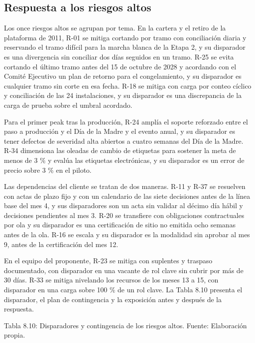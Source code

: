 \documentclass[11pt]{article}
\begin{document}
\subsection{Respuesta a los riesgos altos}

Los once riesgos altos se agrupan por tema. En la cartera y el retiro de la plataforma de 2011, R-01 se mitiga cortando por tramo con conciliación diaria y reservando el tramo difícil para la marcha blanca de la Etapa 2, y su disparador es una divergencia sin conciliar dos días seguidos en un tramo. R-25 se evita cortando el último tramo antes del 15 de octubre de 2028 y acordando con el Comité Ejecutivo un plan de retorno para el congelamiento, y su disparador es cualquier tramo sin corte en esa fecha. R-18 se mitiga con carga por conteo cíclico y conciliación de las 24 instalaciones, y su disparador es una discrepancia de la carga de prueba sobre el umbral acordado.

Para el primer peak tras la producción, R-24 amplía el soporte reforzado entre el paso a producción y el Día de la Madre y el evento anual, y su disparador es tener defectos de severidad alta abiertos a cuatro semanas del Día de la Madre. R-34 dimensiona las oleadas de cambio de etiquetas para sostener la meta de menos de 3 \% y evalúa las etiquetas electrónicas, y su disparador es un error de precio sobre 3 \% en el piloto.

Las dependencias del cliente se tratan de dos maneras. R-11 y R-37 se resuelven con actas de plazo fijo y con un calendario de las siete decisiones antes de la línea base del mes 4, y sus disparadores son un acta sin validar al décimo día hábil y decisiones pendientes al mes 3. R-20 se transfiere con obligaciones contractuales por ola y su disparador es una certificación de sitio no emitida ocho semanas antes de la ola. R-16 se escala y su disparador es la modalidad sin aprobar al mes 9, antes de la certificación del mes 12.

En el equipo del proponente, R-23 se mitiga con suplentes y traspaso documentado, con disparador en una vacante de rol clave sin cubrir por más de 30 días. R-33 se mitiga nivelando los recursos de los meses 13 a 15, con disparador en una carga sobre 100 \% de un rol clave. La Tabla 8.10 presenta el disparador, el plan de contingencia y la exposición antes y después de la respuesta.

Tabla 8.10: Disparadores y contingencia de los riesgos altos. Fuente: Elaboración propia.
\end{document}
